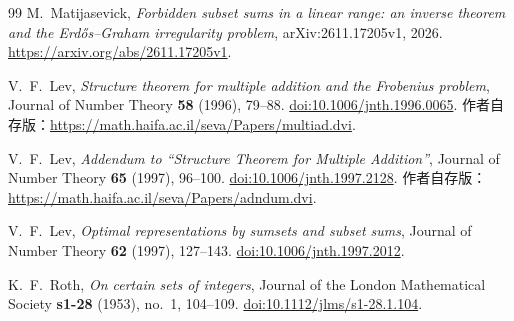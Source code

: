 \documentclass[UTF8,a4paper,11pt,fontset=none]{ctexart}
\theoremstyle{remark}
\begin{document}
\begin{thebibliography}{99}
M.~Matijasevick,
\emph{Forbidden subset sums in a linear range: an inverse theorem and the Erd\H{o}s--Graham irregularity problem},
arXiv:2611.17205v1, 2026.
\url{https://arxiv.org/abs/2611.17205v1}.

V.~F.~Lev,
\emph{Structure theorem for multiple addition and the Frobenius problem},
Journal of Number Theory \textbf{58} (1996), 79--88.
\href{https://doi.org/10.1006/jnth.1996.0065}{doi:10.1006/jnth.1996.0065}.
作者自存版：\url{https://math.haifa.ac.il/seva/Papers/multiad.dvi}.

V.~F.~Lev,
\emph{Addendum to ``Structure Theorem for Multiple Addition''},
Journal of Number Theory \textbf{65} (1997), 96--100.
\href{https://doi.org/10.1006/jnth.1997.2128}{doi:10.1006/jnth.1997.2128}.
作者自存版：\url{https://math.haifa.ac.il/seva/Papers/adndum.dvi}.

V.~F.~Lev,
\emph{Optimal representations by sumsets and subset sums},
Journal of Number Theory \textbf{62} (1997), 127--143.
\href{https://doi.org/10.1006/jnth.1997.2012}{doi:10.1006/jnth.1997.2012}.

K.~F.~Roth,
\emph{On certain sets of integers},
Journal of the London Mathematical Society \textbf{s1-28} (1953), no.~1, 104--109.
\href{https://doi.org/10.1112/jlms/s1-28.1.104}{doi:10.1112/jlms/s1-28.1.104}.
\end{thebibliography}
\end{document}
